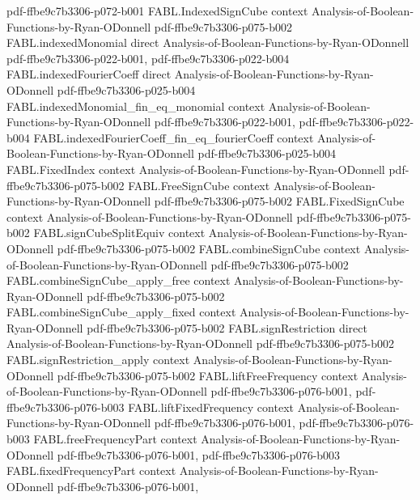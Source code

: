 \begin{theorem}
{    pdf-ffbe9c7b3306-p072-b001}
\proofstep
  {FABL.IndexedSignCube}
  {context}
  {Analysis-of-Boolean-Functions-by-Ryan-ODonnell}
  {pdf-ffbe9c7b3306-p075-b002}
\proofstep
  {FABL.indexedMonomial}
  {direct}
  {Analysis-of-Boolean-Functions-by-Ryan-ODonnell}
  {pdf-ffbe9c7b3306-p022-b001,
    pdf-ffbe9c7b3306-p022-b004}
\proofstep
  {FABL.indexedFourierCoeff}
  {direct}
  {Analysis-of-Boolean-Functions-by-Ryan-ODonnell}
  {pdf-ffbe9c7b3306-p025-b004}
\proofstep
  {FABL.indexedMonomial_fin_eq_monomial}
  {context}
  {Analysis-of-Boolean-Functions-by-Ryan-ODonnell}
  {pdf-ffbe9c7b3306-p022-b001,
    pdf-ffbe9c7b3306-p022-b004}
\proofstep
  {FABL.indexedFourierCoeff_fin_eq_fourierCoeff}
  {context}
  {Analysis-of-Boolean-Functions-by-Ryan-ODonnell}
  {pdf-ffbe9c7b3306-p025-b004}
\proofstep
  {FABL.FixedIndex}
  {context}
  {Analysis-of-Boolean-Functions-by-Ryan-ODonnell}
  {pdf-ffbe9c7b3306-p075-b002}
\proofstep
  {FABL.FreeSignCube}
  {context}
  {Analysis-of-Boolean-Functions-by-Ryan-ODonnell}
  {pdf-ffbe9c7b3306-p075-b002}
\proofstep
  {FABL.FixedSignCube}
  {context}
  {Analysis-of-Boolean-Functions-by-Ryan-ODonnell}
  {pdf-ffbe9c7b3306-p075-b002}
\proofstep
  {FABL.signCubeSplitEquiv}
  {context}
  {Analysis-of-Boolean-Functions-by-Ryan-ODonnell}
  {pdf-ffbe9c7b3306-p075-b002}
\proofstep
  {FABL.combineSignCube}
  {context}
  {Analysis-of-Boolean-Functions-by-Ryan-ODonnell}
  {pdf-ffbe9c7b3306-p075-b002}
\proofstep
  {FABL.combineSignCube_apply_free}
  {context}
  {Analysis-of-Boolean-Functions-by-Ryan-ODonnell}
  {pdf-ffbe9c7b3306-p075-b002}
\proofstep
  {FABL.combineSignCube_apply_fixed}
  {context}
  {Analysis-of-Boolean-Functions-by-Ryan-ODonnell}
  {pdf-ffbe9c7b3306-p075-b002}
\proofstep
  {FABL.signRestriction}
  {direct}
  {Analysis-of-Boolean-Functions-by-Ryan-ODonnell}
  {pdf-ffbe9c7b3306-p075-b002}
\proofstep
  {FABL.signRestriction_apply}
  {context}
  {Analysis-of-Boolean-Functions-by-Ryan-ODonnell}
  {pdf-ffbe9c7b3306-p075-b002}
\proofstep
  {FABL.liftFreeFrequency}
  {context}
  {Analysis-of-Boolean-Functions-by-Ryan-ODonnell}
  {pdf-ffbe9c7b3306-p076-b001,
    pdf-ffbe9c7b3306-p076-b003}
\proofstep
  {FABL.liftFixedFrequency}
  {context}
  {Analysis-of-Boolean-Functions-by-Ryan-ODonnell}
  {pdf-ffbe9c7b3306-p076-b001,
    pdf-ffbe9c7b3306-p076-b003}
\proofstep
  {FABL.freeFrequencyPart}
  {context}
  {Analysis-of-Boolean-Functions-by-Ryan-ODonnell}
  {pdf-ffbe9c7b3306-p076-b001,
    pdf-ffbe9c7b3306-p076-b003}
\proofstep
  {FABL.fixedFrequencyPart}
  {context}
  {Analysis-of-Boolean-Functions-by-Ryan-ODonnell}
  {pdf-ffbe9c7b3306-p076-b001,
}
\end{theorem}
